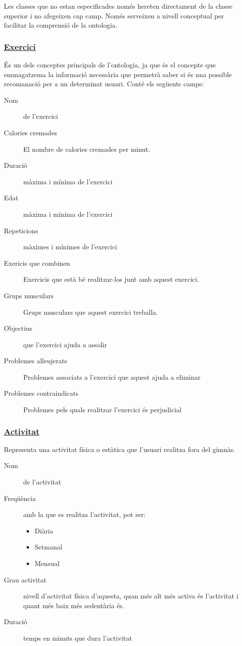 \documentclass[a4paper, 12pt, UTF8]{article}
\begin{document}
\pagebreak

Les classes que no estan especificades només hereten directament de la classe superior i no afegeixen cap camp. Només serveixen a nivell conceptual per facilitar la comprensió de la ontologia.

\subsubsection*{\underline{Exercici}}

És un dels conceptes principals de l'ontologia, ja que és el concepte que emmagatzema la informació necessària que permetrà saber si és una possible recomanació per a un determinat usuari. Conté els següents camps:

\begin{description}
	\item[Nom] de l'exercici
	\item[Calories cremades] El nombre de calories cremades per minut. 
	\item[Duració] màxima i mínima de l'exercici
	\item[Edat] màxima i mínima de l'exercici
	\item[Repeticions] màximes i mínimes de l'exercici
	\item[Exericis que combinen] Exercicis que està bé realitzar-los junt amb aquest exercici.
	\item[Grups musculars] Grups musculars que aquest exercici treballa.
	\item[Objectius] que l'exercici ajuda a assolir
	\item[Problemes alleujerats] Problemes associats a l'exercici que aquest ajuda a eliminar
	\item[Problemes contraindicats] Problemes pels quals realitzar l'exercici és perjudicial
\end{description}

\subsubsection*{\underline{Activitat}}

Representa una activitat física o estàtica que l'usuari realitza fora del gimnàs.

\begin{description}
	\item[Nom] de l'activitat
	\item[Freqüència] amb la que es realitza l'activitat, pot ser:
	\begin{itemize}
		\item Diària
		\item Setmanal
		\item Mensual
	\end{itemize}
	\item[Grau activitat] nivell d'activitat física d'aquesta, quan més alt més activa és l'activitat i quant més baix més sedentària és.
	\item[Duració] temps en minuts que dura l'activitat
\end{description}
\end{document}
